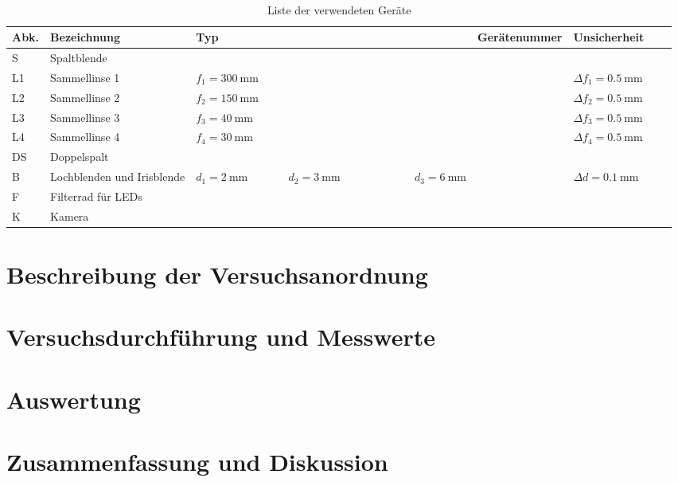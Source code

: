 \documentclass{article}
\begin{document}
\begin{table}[H]
\caption{Liste der verwendeten Geräte}

~

\begin{tabular}{l|p{3cm}p{3cm}llll}
Abk. & Bezeichnung  & Typ & Gerätenummer & Unsicherheit \\
\hline
S & Spaltblende \\
\hline
L1 & Sammellinse 1 & $f_1 = 300~$mm & & $\Delta f_1 = 0.5~$mm \\
\hline
L2 & Sammellinse 2 & $f_2 = 150~$mm & & $\Delta f_2 = 0.5~$mm \\
\hline
L3 & Sammellinse 3 & $f_3 = 40~$mm & & $\Delta f_3 = 0.5~$mm \\
\hline
L4 & Sammellinse 4 & $f_4 = 30~$mm & & $\Delta f_4 = 0.5~$mm \\
\hline
DS & Doppelspalt \\
\hline





B & Lochblenden und Irisblende & $d_1=2~$mm ~ ~ ~ ~ $d_2=3~$mm   ~~~~~~~~~~~~ $d_3=6~$mm & &  $\Delta d = 0.1~$mm \\
\hline
F & Filterrad für LEDs & \\
\hline
K & Kamera
\end{tabular}

\end{table}



\section{Beschreibung der Versuchsanordnung}








\section{Versuchsdurchführung und Messwerte}



\section{Auswertung}








\section{Zusammenfassung und Diskussion}
\end{document}
